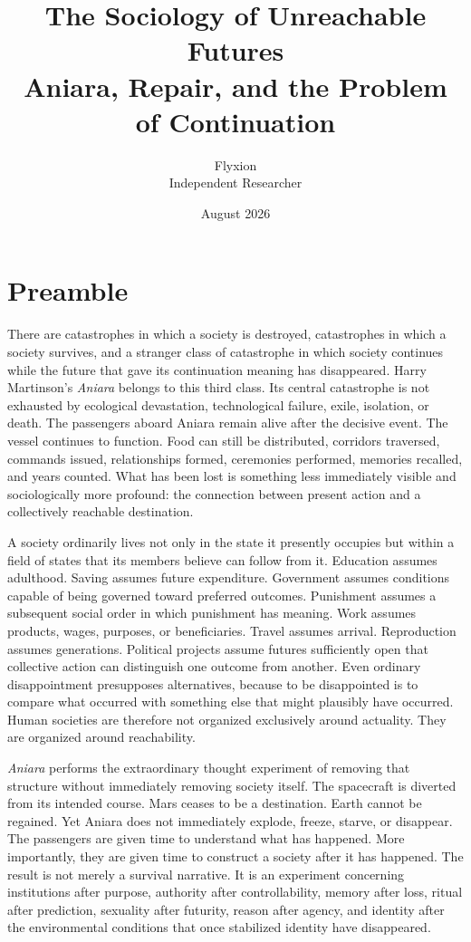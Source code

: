 \documentclass[11pt,oneside]{book}
\title{
    \textbf{The Sociology of Unreachable Futures}\\[0.6em]
    \large Aniara, Repair, and the Problem of Continuation
}
\author{Flyxion\\[0.4em]\small Independent Researcher}
\date{August 2026}
\theoremstyle{definition}
\theoremstyle{remark}
\begin{document}
\frontmatter

\maketitle

\chapter*{Preamble}

There are catastrophes in which a society is destroyed, catastrophes in which a society survives, and a stranger class of catastrophe in which society continues while the future that gave its continuation meaning has disappeared. Harry Martinson's \emph{Aniara} belongs to this third class. Its central catastrophe is not exhausted by ecological devastation, technological failure, exile, isolation, or death. The passengers aboard Aniara remain alive after the decisive event. The vessel continues to function. Food can still be distributed, corridors traversed, commands issued, relationships formed, ceremonies performed, memories recalled, and years counted. What has been lost is something less immediately visible and sociologically more profound: the connection between present action and a collectively reachable destination.

A society ordinarily lives not only in the state it presently occupies but within a field of states that its members believe can follow from it. Education assumes adulthood. Saving assumes future expenditure. Government assumes conditions capable of being governed toward preferred outcomes. Punishment assumes a subsequent social order in which punishment has meaning. Work assumes products, wages, purposes, or beneficiaries. Travel assumes arrival. Reproduction assumes generations. Political projects assume futures sufficiently open that collective action can distinguish one outcome from another. Even ordinary disappointment presupposes alternatives, because to be disappointed is to compare what occurred with something else that might plausibly have occurred. Human societies are therefore not organized exclusively around actuality. They are organized around reachability.

\emph{Aniara} performs the extraordinary thought experiment of removing that structure without immediately removing society itself. The spacecraft is diverted from its intended course. Mars ceases to be a destination. Earth cannot be regained. Yet Aniara does not immediately explode, freeze, starve, or disappear. The passengers are given time to understand what has happened. More importantly, they are given time to construct a society after it has happened. The result is not merely a survival narrative. It is an experiment concerning institutions after purpose, authority after controllability, memory after loss, ritual after prediction, sexuality after futurity, reason after agency, and identity after the environmental conditions that once stabilized identity have disappeared.
\end{document}
